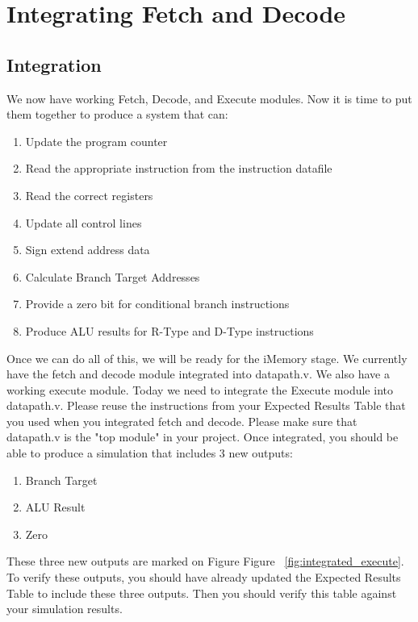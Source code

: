 \chapter{Integrating Fetch and Decode}

\section{Integration}
We now have working Fetch, Decode, and Execute modules.  Now it is time to put them together to produce a system that can:
\begin{enumerate}
	\item Update the program counter
	\item Read the appropriate instruction from the instruction datafile
	\item Read the correct registers
	\item Update all control lines
	\item Sign extend address data
	\item Calculate Branch Target Addresses
	\item Provide a zero bit for conditional branch instructions
	\item Produce ALU results for R-Type and D-Type instructions
\end{enumerate}

Once we can do all of this, we will be ready for the iMemory stage.  We currently have the fetch and decode module integrated into datapath.v.  We also have a working execute module.  Today we need to integrate the Execute module into datapath.v.  Please reuse the instructions from your Expected Results Table that you used when you integrated fetch and decode.  Please make sure that datapath.v is the "top module" in your project.  Once integrated, you should be able to produce a simulation that includes 3 new outputs:
\begin{enumerate}
	\item Branch Target
	\item ALU Result
	\item Zero
\end{enumerate}   

These three new outputs are marked on Figure Figure ~\ref{fig:integrated_execute}.  To verify these outputs, you should have already  updated the Expected Results Table to include these three outputs.  Then you should verify this table against your simulation results.

